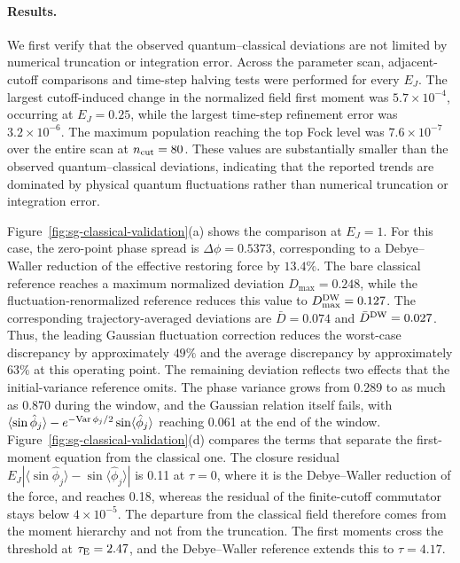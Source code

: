 \documentclass[pra,twocolumn,superscriptaddress,nofootinbib,floatfix]{revtex4-2}
\theoremstyle{remark}
\begin{document}
\paragraph{Results.}
We first verify that the observed quantum--classical deviations are not limited by numerical truncation or integration error. Across the parameter scan, adjacent-cutoff comparisons and time-step halving tests were performed for every \(E_J\). The largest cutoff-induced change in the normalized field first moment was \(5.7\times10^{-4}\), occurring at \(E_J=0.25\), while the largest time-step refinement error was \(3.2\times10^{-6}\). The maximum population reaching the top Fock level was \(7.6\times10^{-7}\) over the entire scan at \(n_{\rm cut}=80\). These values are substantially smaller than the observed quantum--classical deviations, indicating that the reported trends are dominated by physical quantum fluctuations rather than numerical truncation or integration error.

Figure~\ref{fig:sg-classical-validation}(a) shows the comparison at \(E_J=1\). For this case, the zero-point phase spread is \(\Delta\phi=0.5373\), corresponding to a Debye--Waller reduction of the effective restoring force by \(13.4\%\). The bare classical reference reaches a maximum normalized deviation \(D_{\max}=0.248\), while the fluctuation-renormalized reference reduces this value to \(D_{\max}^{\rm DW}=0.127\). The corresponding trajectory-averaged deviations are \(\bar D=0.074\) and \(\bar D^{\rm DW}=0.027\). Thus, the leading Gaussian fluctuation correction reduces the worst-case discrepancy by approximately \(49\%\) and the average discrepancy by approximately \(63\%\) at this operating point. The remaining deviation reflects two effects that the initial-variance reference omits. The phase variance grows from 0.289 to as much as 0.870 during the window, and the Gaussian relation itself fails, with \(\langle\sin\hat\phi_j\rangle-e^{-{\rm Var}\,\phi_j/2}\sin\langle\hat\phi_j\rangle\) reaching 0.061 at the end of the window. Figure~\ref{fig:sg-classical-validation}(d) compares the terms that separate the first-moment equation from the classical one. The closure residual \(E_J|\langle\sin\hat\phi_j\rangle-\sin\langle\hat\phi_j\rangle|\) is 0.11 at \(\tau=0\), where it is the Debye--Waller reduction of the force, and reaches 0.18, whereas the residual of the finite-cutoff commutator stays below \(4\times10^{-5}\). The departure from the classical field therefore comes from the moment hierarchy and not from the truncation. The first moments cross the threshold at \(\tau_{\rm E}=2.47\), and the Debye--Waller reference extends this to \(\tau=4.17\).
\end{document}
